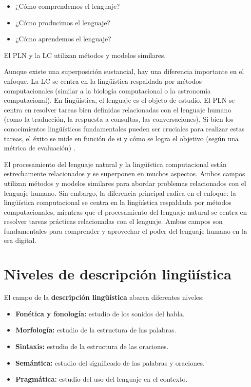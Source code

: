 \documentclass{book}
\begin{document}
\begin{itemize}
  \item ¿Cómo comprendemos el lenguaje?
  \item ¿Cómo producimos el lenguaje?
  \item ¿Cómo aprendemos el lenguaje?
\end{itemize}

El PLN y la LC utilizan métodos y modelos similares.


Aunque existe una superposición sustancial, hay una diferencia importante en el enfoque. La LC se centra en la lingüística respaldada por métodos computacionales (similar a la biología computacional o la astronomía computacional). En lingüística, el lenguaje es el objeto de estudio. El PLN se centra en resolver tareas bien definidas relacionadas con el lenguaje humano (como la traducción, la respuesta a consultas, las conversaciones). Si bien los conocimientos lingüísticos fundamentales pueden ser cruciales para realizar estas tareas, el éxito se mide en función de si y cómo se logra el objetivo (según una métrica de evaluación) \cite{jacobbook}.



El procesamiento del lenguaje natural y la lingüística computacional están estrechamente relacionados y se superponen en muchos aspectos. Ambos campos utilizan métodos y modelos similares para abordar problemas relacionados con el lenguaje humano. Sin embargo, la diferencia principal radica en el enfoque: la lingüística computacional se centra en la lingüística respaldada por métodos computacionales, mientras que el procesamiento del lenguaje natural se centra en resolver tareas prácticas relacionadas con el lenguaje. Ambos campos son fundamentales para comprender y aprovechar el poder del lenguaje humano en la era digital.


\section{Niveles de descripción lingüística}

El campo de la \textbf{descripción lingüística} abarca diferentes niveles:

\begin{itemize}
  \item \textbf{Fonética y fonología:} estudio de los sonidos del habla.
  \item \textbf{Morfología:} estudio de la estructura de las palabras.
  \item \textbf{Sintaxis:} estudio de la estructura de las oraciones.
  \item \textbf{Semántica:} estudio del significado de las palabras y oraciones.
  \item \textbf{Pragmática:} estudio del uso del lenguaje en el contexto.
\end{itemize}
\end{document}
